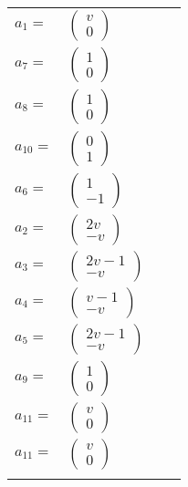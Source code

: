 \documentclass[1p]{elsarticle_modified}
\theoremstyle{definition}
\begin{document}
\begin{tabular}{m{7pt} m{180pt} m{7pt} m{180pt} }
\flushright $a_{1}=$&$\begin{pmatrix}v\\0\end{pmatrix}$ \\
\flushright $a_{7}=$&$\begin{pmatrix}1\\0\end{pmatrix}$ \\
\flushright $a_{8}=$&$\begin{pmatrix}1\\0\end{pmatrix}$ \\
\flushright $a_{10}=$&$\begin{pmatrix}0\\1\end{pmatrix}$ \\
\flushright $a_{6}=$&$\begin{pmatrix}1\\-1\end{pmatrix}$ \\
\flushright $a_{2}=$&$\begin{pmatrix}2 v\\- v\end{pmatrix}$ \\
\flushright $a_{3}=$&$\begin{pmatrix}2 v-1\\- v\end{pmatrix}$ \\
\flushright $a_{4}=$&$\begin{pmatrix}v-1\\- v\end{pmatrix}$ \\
\flushright $a_{5}=$&$\begin{pmatrix}2 v-1\\- v\end{pmatrix}$ \\
\flushright $a_{9}=$&$\begin{pmatrix}1\\0\end{pmatrix}$ \\
\flushright $a_{11}=$&$\begin{pmatrix}v\\0\end{pmatrix}$\\ \flushright $a_{11}=$&$\begin{pmatrix}v\\0\end{pmatrix}$\\&\end{tabular}
\end{document}
